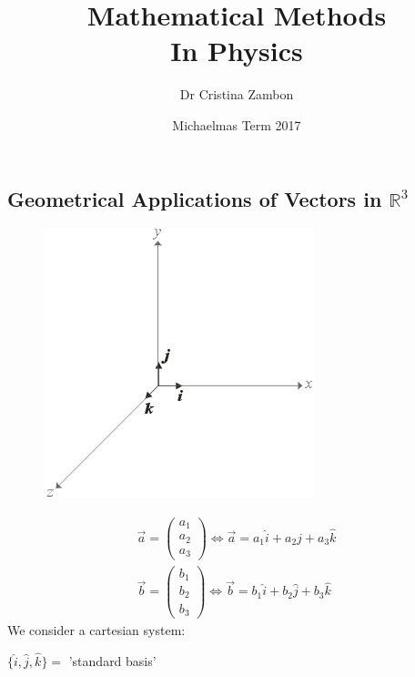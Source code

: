 \documentclass[a4paper, 11pt, normalem]{report}
\title{Mathematical Methods \\ In Physics \vspace{-20pt}}
\author{Dr Cristina Zambon}
\date{\vspace{-15pt}Michaelmas Term 2017}
\begin{document}
\maketitle
\tableofcontents

\chapter{}
\section{Geometrical Applications of Vectors in $\mathbb{R}^3$}
\begin{figure}
    \begin{center}
        \includegraphics[scale=0.5]{Cart.png}
    \end{center}
\end{figure}
\begin{gather*}
    \vec{a} =
    \begin{pmatrix}
        a_1 \\
        a_2 \\
        a_3
    \end{pmatrix}
    \iff
    \vec{a} = a_{1}\hat{i} + a_{2}\hat{j} + a_{3}\hat{k} \\
    \vec{b} =
    \begin{pmatrix}
        b_1 \\
        b_2 \\
        b_3
    \end{pmatrix}
    \iff
    \vec{b} = b_{1}\hat{i} + b_{2}\hat{j} + b_{3}\hat{k}
\end{gather*}
We consider a cartesian system:

$\{\hat{i}, \hat{j}, \hat{k}\} = $ 'standard basis'
\end{document}
